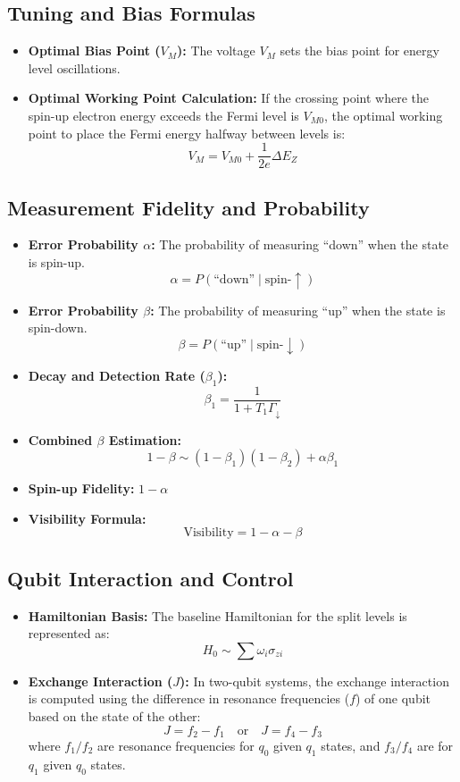 \documentclass{article}
\begin{document}
\subsection*{Tuning and Bias Formulas}
\begin{itemize}
    \item \textbf{Optimal Bias Point ($V_M$):} The voltage $V_M$ sets the bias point for energy level oscillations.
    \item \textbf{Optimal Working Point Calculation:} If the crossing point where the spin-up electron energy exceeds the Fermi level is $V_{M0}$, the optimal working point to place the Fermi energy halfway between levels is:
    \[
    V_M = V_{M0} + \frac{1}{2e} \Delta E_Z
    \]
\end{itemize}

\subsection*{Measurement Fidelity and Probability}
\begin{itemize}
    \item \textbf{Error Probability $\alpha$:} The probability of measuring ``down'' when the state is spin-up.
    \[
    \alpha = P(\text{``down''} \mid \text{spin-}\uparrow)
    \]
    \item \textbf{Error Probability $\beta$:} The probability of measuring ``up'' when the state is spin-down.
    \[
    \beta = P(\text{``up''} \mid \text{spin-}\downarrow)
    \]
    \item \textbf{Decay and Detection Rate ($\beta_1$):}
    \[
    \beta_1 = \frac{1}{1 + T_1 \Gamma_\downarrow}
    \]
    \item \textbf{Combined $\beta$ Estimation:}
    \[
    1 - \beta \sim (1 - \beta_1)(1 - \beta_2) + \alpha \beta_1
    \]
    \item \textbf{Spin-up Fidelity:} $1 - \alpha$
    \item \textbf{Visibility Formula:}
    \[
    \text{Visibility} = 1 - \alpha - \beta
    \]
\end{itemize}

\subsection*{Qubit Interaction and Control}
\begin{itemize}
    \item \textbf{Hamiltonian Basis:} The baseline Hamiltonian for the split levels is represented as:
    \[
    H_0 \sim \sum \omega_i \sigma_{zi}
    \]
    \item \textbf{Exchange Interaction ($J$):} In two-qubit systems, the exchange interaction is computed using the difference in resonance frequencies ($f$) of one qubit based on the state of the other:
    \[
    J = f_2 - f_1 \quad \text{or} \quad J = f_4 - f_3
    \]
    where $f_1/f_2$ are resonance frequencies for $q_0$ given $q_1$ states, and $f_3/f_4$ are for $q_1$ given $q_0$ states.
\end{itemize}
\end{document}
